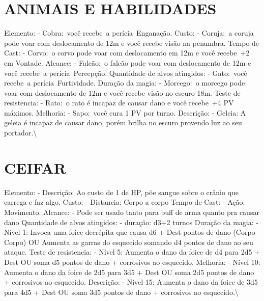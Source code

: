\documentclass{article}%
\begin{document}
%
\section{ANIMAIS E HABILIDADES}%
\label{sec:ANIMAISEHABILIDADES}%
Elemento: {-} Cobra:~você recebe~a perícia~Enganação.\newline%
Custo: {-} Coruja:~a coruja pode voar com deslocamento de 12m e você recebe visão na penumbra.\newline%
Tempo de Cast: {-} Corvo:~o corvo pode voar com deslocamento em 12m e você recebe~+2 em Vontade.\newline%
Alcance: {-} Falcão:~o falcão pode voar com deslocamento de 12m e você recebe~a perícia~Percepção.\newline%
Quantidade de alvos atingidos: {-} Gato:~você recebe~a perícia~Furtividade.\newline%
Duração da magia: {-} Morcego:~o morcego pode voar com deslocamento de 12m e você recebe visão no escuro 18m.\newline%
Teste de resistencia: {-} Rato:~o rato é incapaz de causar dano e você recebe~+4 PV máximos.\newline%
Melhoria: {-} Sapo:~você cura 1 PV por turno.\newline%
Descrição: {-} Geleia: A geleia é incapaz de causar dano, porém brilha no escuro provendo luz ao seu portador.\textbackslash{}

%
\section{CEIFAR}%
\label{sec:CEIFAR}%
Elemento: {-} Descrição: Ao custo de 1 de HP, põe sangue sobre o crânio que carrega e faz algo.\newline%
Custo: {-} Distancia: Corpo a corpo\newline%
Tempo de Cast: {-} Ação: Movimento.\newline%
Alcance: {-} Pode ser usado tanto para buff de arma quanto pra causar dano\newline%
Quantidade de alvos atingidos: {-} duração: d3+2 turnos\newline%
Duração da magia: {-} Nível 1: Invoca uma foice decrépita que causa d6 + Dest pontos de dano (Corpo{-}Corpo) OU Aumenta as garras do esquecido somando d4 pontos de dano ao seu ataque.\newline%
Teste de resistencia: {-} Nível 5: Aumenta o dano da foice de d4 para 2d5 + Dest  OU soma d5 pontos de dano + corrosivos ao esquecido.\newline%
Melhoria: {-} Nível 10: Aumenta o dano da foice de 2d5 para 3d5 + Dest OU soma 2d5 pontos de dano + corrosivos ao esquecido.\newline%
Descrição: {-} Nível 15: Aumenta o dano da foice de 3d5 para 4d5 + Dest OU soma 3d5 pontos de dano + corrosivos ao esquecido.\textbackslash{}
\end{document}
